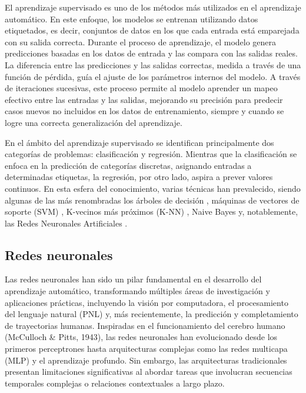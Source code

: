 El aprendizaje supervisado es uno de los métodos más utilizados en el aprendizaje automático. En este enfoque, los modelos se entrenan utilizando datos etiquetados, es decir, conjuntos de datos en los que cada entrada está emparejada con su salida correcta. Durante el proceso de aprendizaje, el modelo genera predicciones basadas en los datos de entrada y las compara con las salidas reales. La diferencia entre las predicciones y las salidas correctas, medida a través de una función de pérdida, guía el ajuste de los parámetros internos del modelo. A través de iteraciones sucesivas, este proceso permite al modelo aprender un mapeo efectivo entre las entradas y las salidas, mejorando su precisión para predecir casos nuevos no incluidos en los datos de entrenamiento, siempre y cuando se logre una correcta generalización del aprendizaje.

En el ámbito del aprendizaje supervisado se identifican principalmente dos categorías de problemas: clasificación y regresión. Mientras que la clasificación se enfoca en la predicción de categorías discretas, asignando entradas a determinadas etiquetas, la regresión, por otro lado, aspira a prever valores continuos. En esta esfera del conocimiento, varias técnicas han prevalecido, siendo algunas de las más renombradas los árboles de decisión \cite{breiman2017classification}, máquinas de vectores de soporte (SVM) \cite{cortes1995support}, K-vecinos más próximos (K-NN) \cite{cover1967nearest}, Naive Bayes \cite{john2013estimating} y, notablemente, las Redes Neuronales Artificiales \cite{chollet2021deep}.

\subsection{Redes neuronales}

Las redes neuronales han sido un pilar fundamental en el desarrollo del aprendizaje automático, transformando múltiples áreas de investigación y aplicaciones prácticas, incluyendo la visión por computadora, el procesamiento del lenguaje natural (PNL) y, más recientemente, la predicción y completamiento de trayectorias humanas. Inspiradas en el funcionamiento del cerebro humano (McCulloch \& Pitts, 1943), las redes neuronales han evolucionado desde los primeros perceptrones hasta arquitecturas complejas como las redes multicapa (MLP) y el aprendizaje profundo. Sin embargo, las arquitecturas tradicionales presentan limitaciones significativas al abordar tareas que involucran secuencias temporales complejas o relaciones contextuales a largo plazo.


